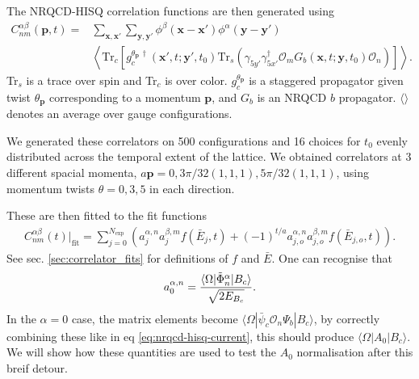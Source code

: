 The NRQCD-HISQ correlation functions are then generated using
\begin{align}
    \label{eq:nrqcd-hisq-2pt}
  C_{nm}^{\alpha \beta}({\textbf{p}},t) =& \sum_{{\textbf{x}},{\textbf{x}}'} \sum_{{\textbf{y}},{\textbf{y}}'}
  \phi^{\beta}({\textbf{x}}-{\textbf{x}}') \phi^{\alpha}({\textbf{y}}-{\textbf{y}}') \\ \nonumber
  &\left\langle \text{Tr}_c \left[  g^{\theta_{\textbf{p}}\,\dagger}_c({\textbf{x}}',t;{\textbf{y}}',t_0) \text{Tr}_s\left( \gamma_{5y'} \gamma_{5x'}^{\dagger} \mathcal{O}_m G_b({\textbf{x}},t;{\textbf{y}},t_0) \mathcal{O}_n \right) \right]\right\rangle.
\end{align}
Tr$_s$ is a trace over spin and Tr$_c$ is over color. $g^{\theta_{\textbf{p}}}_c$ is a staggered propagator given twist $\theta_{\textbf{p}}$ corresponding to a momentum ${\textbf{p}}$, and $G_b$ is an NRQCD $b$ propagator. $\langle\rangle$ denotes an average over gauge configurations.

We generated these correlators on 500 configurations and 16 choices for $t_0$ evenly distributed across the temporal extent of the lattice. We obtained correlators at 3 different spacial momenta, $a\textbf{p} = 0, 3\pi/32(1,1,1), 5\pi/32(1,1,1)$, using momentum twists $\theta=0,3,5$ in each direction.

These are then fitted to the fit functions 
\begin{align}
  C^{\alpha\beta}_{nm}(t)|_{\text{fit}} = \sum_{j=0}^{N_{\text{exp}}} \left( a^{\alpha,n}_j a^{\beta,m}_j f(\bar{E}_j,t) + (-1)^{t/a} a^{\alpha,n}_{j,o} a^{\beta,m}_{j,o} f(\bar{E}_{j,o},t) \right).
  \label{eq:2ptfit_wsmears}
\end{align}
See sec. \ref{sec:correlator_fits} for definitions of $f$ and $\bar{E}$. One can recognise that
\begin{align}
  a_0^{\alpha,n} = {\langle \Omega | \tilde{\Phi}^{\alpha}_n | B_c \rangle \over \sqrt{2 E_{B_c}}}.
\end{align}
In the $\alpha=0$ case, the matrix elements become $\langle \Omega | \bar{\psi}_c \mathcal{O}_n \Psi_b | B_c \rangle$, by correctly combining these like in eq \eqref{eq:nrqcd-hisq-current}, this should produce $\langle \Omega | A_0 | B_c \rangle$. We will show how these quantities are used to test the $A_0$ normalisation after this breif detour.

